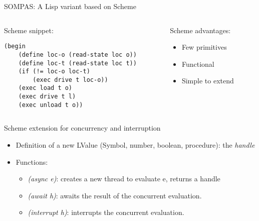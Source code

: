 \begin{frame}[fragile]{SOMPAS: A Lisp variant based on Scheme}
    \begin{columns}[t]

        \begin{column}{0.5\textwidth}
Scheme snippet:
            \lstset{columns=fullflexible}
            \begin{lstlisting}
(begin
    (define loc-o (read-state loc o))
    (define loc-t (read-state loc t))
    (if (!= loc-o loc-t)
        (exec drive t loc-o))
    (exec load t o) 
    (exec drive t l)
    (exec unload t o))             
            \end{lstlisting}
        \end{column}
        \begin{column}{0.5\textwidth}
            Scheme advantages:
            \begin{itemize}
                \item Few primitives
                \item Functional
                \item Simple to extend
            \end{itemize}
        \end{column}
     \end{columns}

\end{frame}

\begin{frame}{Scheme extension for concurrency and interruption}
    \begin{itemize}
        \item Definition of a new LValue (Symbol, number, boolean, procedure): the \emph{handle}
        \item Functions:
        \begin{itemize}
            \item \textit{(async e)}: creates a new thread to evaluate e, returns a handle
            \item \textit{(await h)}: awaits the result of the concurrent evaluation.
            \item \textit{(interrupt h)}: interrupts the concurrent evaluation.
        \end{itemize}
    \end{itemize}
\end{frame}


    
